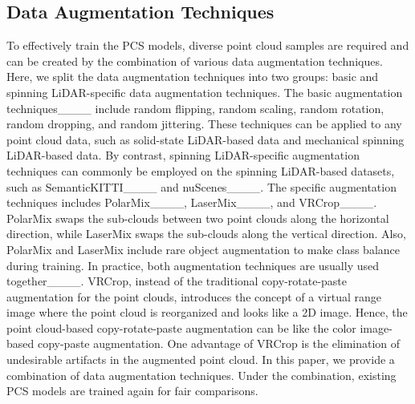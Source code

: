 \subsection{Data Augmentation Techniques}
To effectively train the PCS models, diverse point cloud samples are required and can be created by the combination of various data augmentation techniques. Here, we split the data augmentation techniques into two groups: basic and spinning LiDAR-specific data augmentation techniques. The basic augmentation techniques____ include random flipping, random scaling, random rotation, random dropping, and random jittering. These techniques can be applied to any point cloud data, such as solid-state LiDAR-based data and mechanical spinning LiDAR-based data. By contrast, spinning LiDAR-specific augmentation techniques can commonly be employed on the spinning LiDAR-based datasets, such as SemanticKITTI____ and nuScenes____. The specific augmentation techniques includes PolarMix____, LaserMix____, and VRCrop____. PolarMix swaps the sub-clouds between two point clouds along the horizontal direction, while LaserMix swaps the sub-clouds along the vertical direction. Also, PolarMix and LaserMix include rare object augmentation to make class balance during training. In practice, both augmentation techniques are usually used together____. VRCrop, instead of the traditional copy-rotate-paste augmentation for the point clouds, introduces the concept of a virtual range image where the point cloud is reorganized and looks like a 2D image. Hence, the point cloud-based copy-rotate-paste augmentation can be like the color image-based copy-paste augmentation. One advantage of VRCrop is the elimination of undesirable artifacts in the augmented point cloud. In this paper, we provide a combination of data augmentation techniques. Under the combination, existing PCS models are trained again for fair comparisons.


